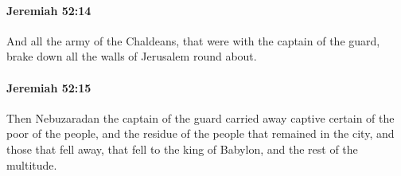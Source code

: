 		\paragraph{Jeremiah 52:14} %
			\label{JEREMIAH-52-14}

			And all the army of the Chaldeans, that were with the captain of the guard, brake down all the walls of Jerusalem round about.


		\paragraph{Jeremiah 52:15} %
			\label{JEREMIAH-52-15}

			Then Nebuzaradan the captain of the guard carried away captive certain of the poor of the people, and the residue of the people that remained in the city, and those that fell away, that fell to the king of Babylon, and the rest of the multitude.

